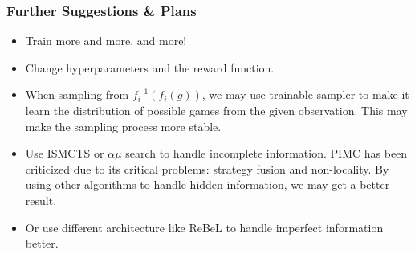 \begin{frame}[fragile]
  \frametitle{Further Suggestions \& Plans}

  \begin{itemize}
    \item Train more and more, and more!
    \item Change hyperparameters and the reward function.
    \item When sampling from $f_i^{-1}(f_i(g))$, we may use trainable sampler to make it learn the distribution of possible games from the given observation. This may make the sampling process more stable.
    \item Use ISMCTS or $\alpha\mu$ search to handle incomplete information.
    PIMC has been criticized due to its critical problems: strategy fusion and non-locality. By using other algorithms to handle hidden information, we may get a better result.
    \item Or use different architecture like ReBeL to handle imperfect information better.
  \end{itemize}
\end{frame}
